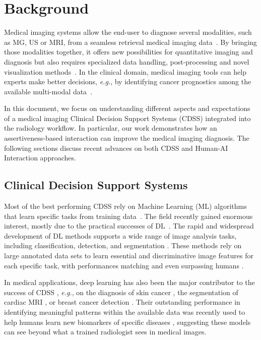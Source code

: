 \section{Background}
\label{sec:sec002}

Medical imaging systems allow the end-user to diagnose several modalities\footnotemark[1], such as MG, US or MRI, from a seamless retrieval medical imaging data~\cite{faraji2019radiologic}.
By bringing those modalities together, it offers new possibilities for quantitative imaging and diagnosis but also requires specialized data handling, post-processing and novel visualization methods~\cite{Igarashi:2016:IVS:2984511.2984537}.
In the clinical domain, medical imaging tools can help experts make better decisions, {\it e.g.}, by identifying cancer prognostics among the available multi-modal data~\cite{Lopes:2017:UHC:3143820.3144118}.

In this document, we focus on understanding different aspects and expectations of a medical imaging Clinical Decision Support Systems (CDSS) integrated into the radiology workflow.
In particular, our work demonstrates how an assertiveness-based interaction can improve the medical imaging diagnosis.
The following sections discuss recent advances on both CDSS and Human-AI Interaction approaches.

\subsection{Clinical Decision Support Systems}
\label{sec:sec00201}

Most of the best performing CDSS rely on Machine Learning (ML) algorithms that learn specific tasks from training data~\cite{calisto2020breastscreening}.
The field recently gained enormous interest, mostly due to the practical successes of DL~\cite{10.1007/978-3-030-22871-2_67}.
The rapid and widespread development of DL methods supports a wide range of image analysis tasks, including classification, detection, and segmentation \cite{lecun2015deep}.
These methods rely on large annotated data sets to learn essential and discriminative image features for each specific task, with performances matching and even surpassing humans \cite{esteva2017dermatologist}.

In medical applications, deep learning has also been the major contributor to the success of CDSS \cite{esteva2019guide}, \textit{e.g.}, on the diagnosis of skin cancer \cite{esteva2017dermatologist}, the segmentation of cardiac MRI \cite{8759179}, or breast cancer detection \cite{MAICAS2019101562}.
Their outstanding performance in identifying meaningful patterns within the available data was recently used to help humans learn new biomarkers of specific diseases \cite{ wang2019deep}, suggesting these models can see beyond what a trained radiologist sees in medical images.

